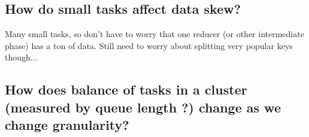 \subsection{How do small tasks affect data skew?}
Many small tasks, so don't have to worry that one reducer (or other intermediate phase) has a ton of data.  Still need to worry about splitting very popular keys though...

\subsection{How does balance of tasks in a cluster (measured by queue length ?) change as we change granularity?}
